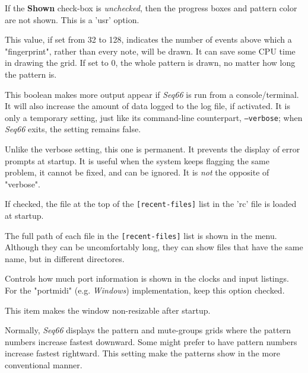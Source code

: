    If the \textbf{Shown} check-box
   is \textsl{unchecked}, then the progress boxes and pattern color are not
   shown.
   This is a 'usr' option.

   This value, if set from 32 to 128, indicates the number of events above
   which a "fingerprint", rather than every note, will be drawn.  It can
   save some CPU time in drawing the grid.  If set to 0, the whole
   pattern is drawn, no matter how long the pattern is.

   This boolean makes more output appear if \textsl{Seq66} is run from a
   console/terminal. It will also increase the amount of data logged to the log
   file, if activated. It is only a temporary setting, just like
   its command-line counterpart, \texttt{--verbose}; when
   \textsl{Seq66} exits, the setting remains false.

   Unlike the verbose setting, this one is permanent.
   It prevents the display of error prompts at startup.
   It is useful when the system keeps flagging the same problem,
   it cannot be fixed, and can be ignored.
   It is \textsl{not} the opposite of "verbose".

   If checked, the file at the top of the \texttt{[recent-files]}
   list in the 'rc' file is loaded at startup.

   The full path of each file in the \texttt{[recent-files]} list
   is shown in the menu.  Although they can be uncomfortably long, they can
   show files that have the same name, but in different directores.

   Controls how much port information is shown in the clocks and input
   listings.  For the "portmidi" (e.g. \textsl{Windows})
   implementation, keep this option checked.

   This item makes the window non-resizable after startup.

   Normally, \textsl{Seq66} displays the pattern and mute-groups grids
   where the pattern numbers increase fastest downward.
   Some might prefer to have pattern numbers increase fastest rightward.
   This setting make the patterns show in the more conventional manner.

